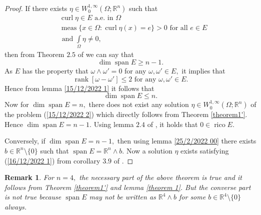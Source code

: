 \documentclass[11pt, a4paper, reqno]{amsart}
\numberwithin{equation}{section}
\newcommand{\spann}{\operatorname{span}}
\newcommand{\meas}{\operatorname{meas}}
\newcommand{\rank}{\operatorname{rank}}
\newcommand{\curl}{\operatorname{curl}}
\newcommand{\rico}{\operatorname{rico}}
\newtheorem{remark}[theorem]{Remark}
\begin{document}
 \begin{proof}
     If there exists $\eta \in W_0^{1,\infty}(\Omega;\mathbb R^n)$ such that 
     \begin{align} \label{15/12/2022 2}
     & \curl \eta \in E \textrm{ a.e. in } \Omega  \nonumber \\
      & \meas\{x\in \Omega : \curl \eta (x)=e\}>0 \textrm{ for all } e\in E\\
      & \textrm{ and } \int\limits_{\Omega}\eta \neq 0, \nonumber
     \end{align}
     then from Theorem $2.5$ of \cite{bandyopadhyay2015some} we can say that $$\dim \spann E\geq n-1.$$
     As $E$ has the property that $\omega \wedge \omega' =0$ for any $\omega,\omega' \in E,$ it implies that $$\rank[\omega-\omega']\leq 2 \textrm{ for any } \omega, \omega'\in E.$$
     Hence  from lemma \ref{15/12/2022 1} it follows that $$\dim \spann E\leq n.$$
     Now for $\dim \spann E=n,$ there does not exist any solution $\eta \in W_0^{1,\infty}(\Omega;\mathbb R^n)$ of the problem (\ref{15/12/2022 2}) which directly follows from Theorem \ref{theorem1'}. Hence $\dim \spann E=n-1.$ Using lemma $2.4$ of \cite{bandyopadhyay2015some}, it holds that $0\in \rico E.$ 

     Conversely, if $\dim \spann E=n-1,$ then using lemma \ref{25/2/2022 00} there exists $b\in \mathbb R^n \setminus \{0\}$ such that $\spann E=\mathbb R^n \wedge b$. Now a solution $\eta $ exists satisfying (\ref{16/12/2022 1}) from corollary $3.9$ of \cite{bandyopadhyay2015some}.
     
 \end{proof}

\begin{remark}
    For $n=4,$ the necessary part of the above theorem is true and it follows from Theorem \ref{theorem1'} and lemma \ref{theorem 1}. But the converse part is not true because $\spann E$ may not be written as $\mathbb R^4\wedge b$ for some $b\in \mathbb R^4\setminus \{0\}$ always.
\end{remark}
\end{document}
